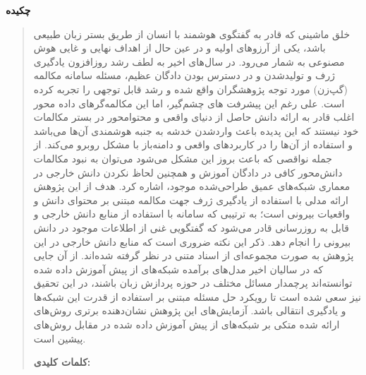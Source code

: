 \thispagestyle{empty}
\centerline{\textbf{\large{چکیده}}}
\begin{quote}
خلق ماشینی که قادر به گفتگوی هوشمند با انسان از طریق بستر زبان طبیعی باشد، یکی از آرزوهای اولیه و در عین حال از اهداف 
نهایی و غایی هوش مصنوعی به شمار می‌رود. 
در سال‌های اخیر به لطف رشد روزافزون یادگیری ژرف و تولیدشدن و در دسترس بودن دادگان عظیم، مسئله سامانه‌ مکالمه (گپ‌زن) مورد توجه
پژوهشگران واقع شده و رشد قابل توجهی را تجربه کرده است.
علی رغم این پیشرفت های چشم‌گیر، اما این مکالمه‌گر‌های داده محور اغلب قادر به ارائه دانش حاصل از دنیای واقعی و محتوامحور در بستر مکالمات خود نیستند که این پدیده باعث واردشدن خدشه به جنبه هوشمندی آن‌ها می‌باشد و استفاده از آن‌ها را در کاربردهای واقعی
و دامنه‌باز
 با مشکل روبرو می‌کند.
از جمله نواقصی که باعث بروز این مشکل می‌شود می‌توان به نبود مکالمات دانش‌محور کافی در دادگان آموزش و همچنین لحاظ نکردن دانش خارجی در معماری شبکه‌های عمیق طراحی‌شده موجود، اشاره کرد.
\newline  
هدف از این پژوهش ارائه مدلی با استفاده از یادگیری ژرف جهت مکالمه مبتنی بر محتوای دانش و واقعیات بیرونی است؛ به ترتیبی که سامانه با استفاده از منابع دانش خارجی و قابل به روزرسانی قادر می‌شود که گفتگویی غنی از اطلاعات موجود در دانش بیرونی را انجام دهد. ذکر این نکته ضروری است که منابع دانش خارجی در این پژوهش به صورت مجموعه‌ای از اسناد متنی در نظر گرفته شده‌اند.
\newline
از آن جایی که در سالیان اخیر مدل‌های برآمده شبکه‌های از پیش آموزش داده شده توانسته‌اند پرچمدار مسائل مختلف در حوزه پردازش زبان باشند، در این تحقیق نیز سعی شده است تا رویکرد حل مسئله مبتنی بر استفاده از قدرت این شبکه‌ها و یادگیری انتقالی باشد. آزمایش‌های این پژوهش نشان‌دهنده برتری روش‌های ارائه شده متکی بر شبکه‌های از پیش آموزش داده شده در مقابل روش‌های پیشین است.

\vskip 1cm
\textbf{کلمات کلیدی:} 
\end{quote}